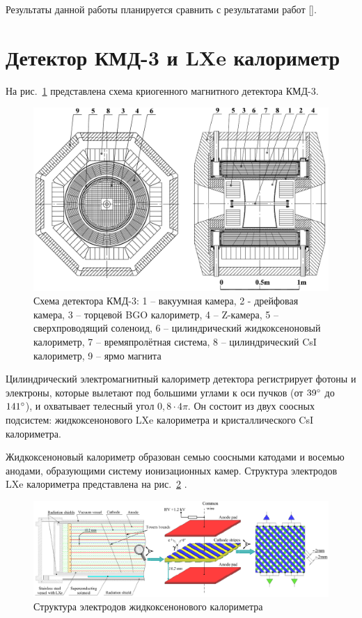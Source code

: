 \documentclass[14pt]{extarticle}
\begin{document}
Результаты данной работы планируется сравнить с результатами работ [].
\section{Детектор КМД-3 и LXe калориметр}
На рис.~\ref{fig:cmd3} представлена схема криогенного магнитного детектора КМД-3.
\begin{figure}[h!]
	\includegraphics[width=\linewidth]{../pics/cmd3-2.png}
	\caption{Схема детектора КМД-3: 1 -- вакуумная камера, 2 - дрейфовая камера, 3 -- торцевой BGO калориметр, 4 -- Z-камера, 5 -- сверхпроводящий соленоид, 6 -- цилиндрический жидкоксеноновый калориметр, 7 -- времяпролётная система, 8 -- цилиндрический CsI калориметр, 9 -- ярмо магнита \cite{shebalin}}
	\label{fig:cmd3}
\end{figure}

Цилиндрический электромагнитный калориметр детектора регистрирует фотоны и электроны, которые вылетают под большими углами к оси пучков (от $39\degree$ до $141\degree$), и охватывает телесный угол $0,8 \cdot 4\pi$. Он состоит из двух соосных подсистем: жидкоксенонового LXe калориметра и кристаллического CsI калориметра.

Жидкоксеноновый калориметр образован семью соосными катодами и восемью анодами, образующими систему ионизационных камер. Структура электродов LXe калориметра представлена на рис.~\ref{fig:lxe-electrodes} \cite{shebalin}.

\begin{figure}[h!]
	\includegraphics[width=\linewidth]{../pics/lxe-electrodes.png}
	\caption{Структура электродов жидкоксенонового калориметра}
	\label{fig:lxe-electrodes}
\end{figure}
\end{document}
